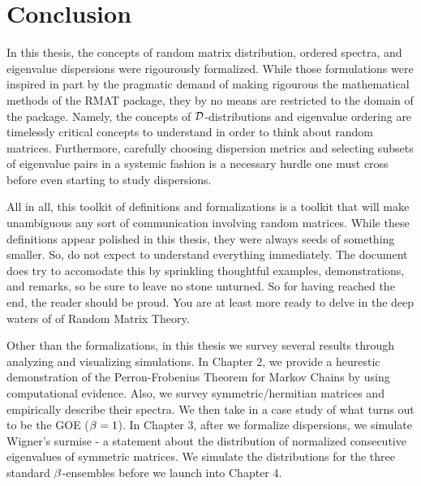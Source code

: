 
  \chapter*{Conclusion}

\medskip

In this thesis, the concepts of random matrix distribution, ordered spectra, and eigenvalue dispersions were rigourously formalized.
While those formulations were inspired in part by the pragmatic demand of making rigourous the mathematical methods of the RMAT package, they by no means are restricted to the domain of the package. Namely, the concepts of $\mathcal{D}$-distributions and eigenvalue ordering are timelessly critical concepts to understand in order to think about random matrices. Furthermore, carefully choosing dispersion metrics and selecting subsets of eigenvalue pairs in a systemic fashion is a necessary hurdle one must cross before even starting to study dispersions. \newline

All in all, this toolkit of definitions and formalizations is a toolkit that will make unambiguous any sort of communication involving random matrices. While these definitions appear polished in this thesis, they were always seeds of something smaller. So, do not expect to understand everything immediately. The document does try to accomodate this by sprinkling thoughtful examples, demonstrations, and remarks, so be sure to leave no stone unturned. So for having reached the end, the reader should be proud. You are at least more ready to delve in the deep waters of of Random Matrix Theory. \newline

Other than the formalizations, in this thesis we survey several results through analyzing and visualizing simulations. In Chapter 2, we provide a heurestic demonstration of the Perron-Frobenius Theorem for Markov Chains by using computational evidence. Also, we survey symmetric/hermitian matrices and empirically describe their spectra. We then take in a case study of what turns out to be the GOE ($\beta = 1$). In Chapter 3, after we formalize dispersions, we simulate Wigner's surmise - a statement about the distribution of normalized consecutive eigenvalues of symmetric matrices. We simulate the distributions for the three standard $\beta$-ensembles before we launch into Chapter 4. \newline

